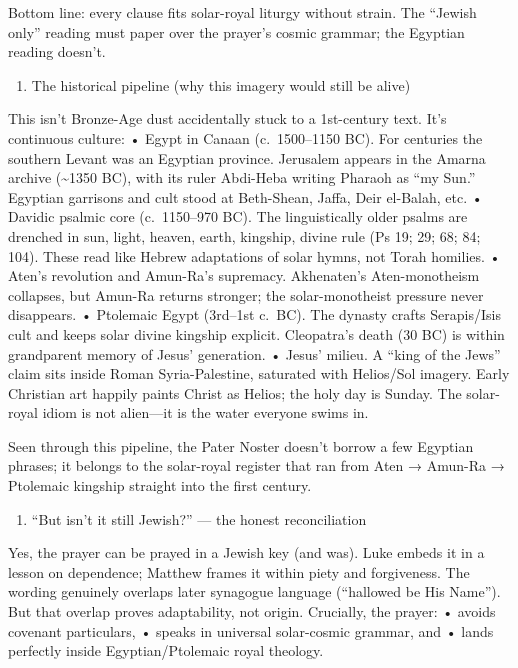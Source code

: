 Bottom line: every clause fits solar-royal liturgy without strain.
The ``Jewish only'' reading must paper over the prayer's cosmic grammar; the Egyptian reading doesn't.

\begin{enumerate}
\def\labelenumi{\arabic{enumi})}
\setcounter{enumi}{3}
\tightlist
\item
  The historical pipeline (why this imagery would still be alive)
\end{enumerate}

This isn't Bronze-Age dust accidentally stuck to a 1st-century text.
It's continuous culture: • Egypt in Canaan (c.~1500--1150 BC).
For centuries the southern Levant was an Egyptian province.
Jerusalem appears in the Amarna archive (\textasciitilde1350 BC), with its ruler Abdi-Heba writing Pharaoh as ``my Sun.'' Egyptian garrisons and cult stood at Beth-Shean, Jaffa, Deir el-Balah, etc.
• Davidic psalmic core (c.~1150--970 BC).
The linguistically older psalms are drenched in sun, light, heaven, earth, kingship, divine rule (Ps 19; 29; 68; 84; 104).
These read like Hebrew adaptations of solar hymns, not Torah homilies.
• Aten's revolution and Amun-Ra's supremacy.
Akhenaten's Aten-monotheism collapses, but Amun-Ra returns stronger; the solar-monotheist pressure never disappears.
• Ptolemaic Egypt (3rd--1st c.~BC).
The dynasty crafts Serapis/Isis cult and keeps solar divine kingship explicit.
Cleopatra's death (30 BC) is within grandparent memory of Jesus' generation.
• Jesus' milieu.
A ``king of the Jews'' claim sits inside Roman Syria-Palestine, saturated with Helios/Sol imagery.
Early Christian art happily paints Christ as Helios; the holy day is Sunday.
The solar-royal idiom is not alien---it is the water everyone swims in.

Seen through this pipeline, the Pater Noster doesn't borrow a few Egyptian phrases; it belongs to the solar-royal register that ran from Aten → Amun-Ra → Ptolemaic kingship straight into the first century.

\begin{enumerate}
\def\labelenumi{\arabic{enumi})}
\setcounter{enumi}{4}
\tightlist
\item
  ``But isn't it still Jewish?'' --- the honest reconciliation
\end{enumerate}

Yes, the prayer can be prayed in a Jewish key (and was).
Luke embeds it in a lesson on dependence; Matthew frames it within piety and forgiveness.
The wording genuinely overlaps later synagogue language (``hallowed be His Name'').
But that overlap proves adaptability, not origin.
Crucially, the prayer: • avoids covenant particulars, • speaks in universal solar-cosmic grammar, and • lands perfectly inside Egyptian/Ptolemaic royal theology.

